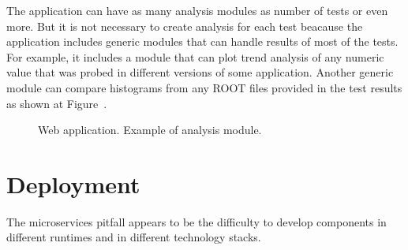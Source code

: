 \documentclass[a4paper]{jpconf}
\begin{document}
The application can have as many analysis modules as  number of tests or even
more. But it is not necessary to create analysis for each test beacause the
application includes generic modules that can handle results of most of the
tests. For example, it includes a module that can plot trend analysis of any
numeric value that was probed in different versions of some application. Another
generic module can compare histograms from any ROOT files provided in the
test results as  shown at Figure~.


\begin{figure}[H]
\centering
{}
\quad
{}
\label{figwebapp}
\caption{Web application. Example of analysis module.}
\end{figure}

\section{Deployment}
The microservices pitfall appears to be the difficulty to develop components in different runtimes and in
different technology stacks.
\end{document}
